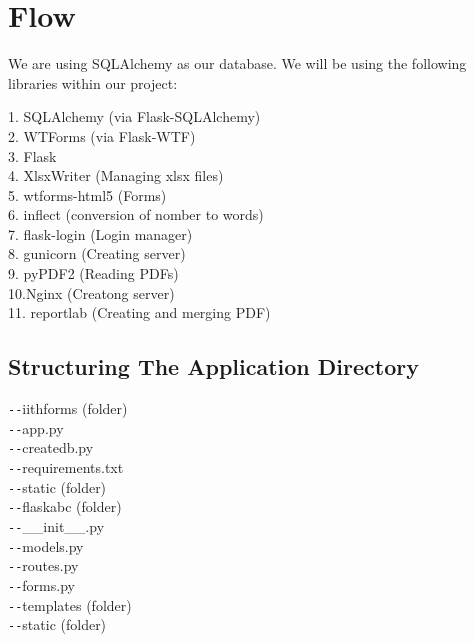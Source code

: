 \documentclass[journal,12pt,twocolumn]{IEEEtran}
\begin{document}
\section{\textbf{Flow}}
\begin{flushleft}
We are using SQLAlchemy as our database. We will be using the following libraries within our project: \par

1. SQLAlchemy (via Flask-SQLAlchemy) \\
2. WTForms (via Flask-WTF) \\
3. Flask \\
4. XlsxWriter (Managing xlsx files) \\
5. wtforms-html5 (Forms) \\
6. inflect (conversion of nomber to words) \\
7. flask-login (Login manager)\\
8. gunicorn (Creating server)\\
9. pyPDF2 (Reading PDFs)\\
10.Nginx (Creatong server)\\
11. reportlab (Creating and merging PDF)\\
\end{flushleft}
\subsection{\textbf{Structuring The Application Directory}}
\begin{flushleft}
\texttt{-{}-}iithforms (folder)\\
\qquad \texttt{-{}-}app.py \\
\qquad \texttt{-{}-}createdb.py \\
\qquad \texttt{-{}-}requirements.txt \\
\qquad \texttt{-{}-}static (folder)\\
\qquad \texttt{-{}-}flaskabc (folder)\\ 
\qquad \qquad \texttt{-{}-}\_\_init\_\_.py \\        
\qquad \qquad \texttt{-{}-}models.py \\
\qquad \qquad \texttt{-{}-}routes.py \\
\qquad \qquad \texttt{-{}-}forms.py \\
\qquad \qquad \texttt{-{}-}templates (folder)\\
\qquad \qquad \texttt{-{}-}static (folder)\\
\end{flushleft}
\end{document}
